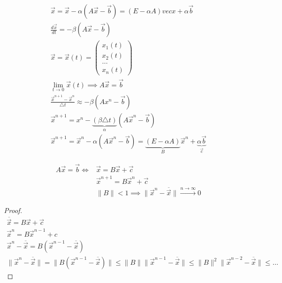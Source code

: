 \begin{gather*}
  \vec{x} = \vec{x} - \alpha(A\vec{x} - \vec{b}) = (E - \alpha A) vec{x} +
  \alpha \vec{b}\\
  \frac{d\vec{x}}{dt} = - \beta (A \vec{x} - \vec{b})\\
  \vec{x} = \vec{x}(t) = \begin{pmatrix}
    x_1(t)\\
    x_2(t)\\
    \dots\\
    x_n(t)
  \end{pmatrix} \\
  \lim_{t \to 0} \vec{x}(t) \implies A\vec{x} = \vec{b} \\
  \frac{\vec{x}^{n + 1} - \vec{x}^n}{\triangle t} \approx - \beta (Ax^n -
  \vec{b}) \\
  \vec{x}^{n + 1} = x^n - \underbrace{(\beta \triangle t)}_{\alpha} (A\vec{x}^n
  - \vec{b}) \\
  \vec{x}^{n + 1} = \vec{x}^n - \alpha (A \vec{x}^n - \vec{b}) = \underbrace{(E
    - \alpha A)}_{B} \vec{x}^n + \underbrace{\alpha \vec{b}}_{\vec{c}}
\end{gather*}

\begin{note}
  \begin{align*}
    A \vec{x} = \vec{b} \iff &\vec{x} = B\vec{x} + \vec{c}\\
                             &\vec{x}^{n + 1} = B\vec{x}^n + \vec{c}\\
                             &\|B\| < 1 \implies \|\vec{x}^n - \overline{\vec{x}}\| \xrightarrow{n \to \infty} 0
  \end{align*}
\end{note}

\begin{proof}
  \begin{gather*}
    \overline{\vec{x}} = B \vec{x}+ \vec{c}\\
    \vec{x}^n = B \vec{x}^{n - 1} + c\\
    \vec{x}^n - \overline{\vec{x}} = B (\vec{x}^{n - 1} -\overline{\vec{x}}) \\
    \|\vec{x}^n - \overline{\vec{x}}\| = \|B(\vec{x}^{n - 1}
    -\overline{\vec{x}})\| \leq \|B\|\|\vec{x}^{n - 1} - \overline{\vec{x}}\|
    \leq \|B\|^2 \|\vec{x}^{n - 2} - \overline{\vec{x}}\| \leq \dots
  \end{gather*}
\end{proof}

